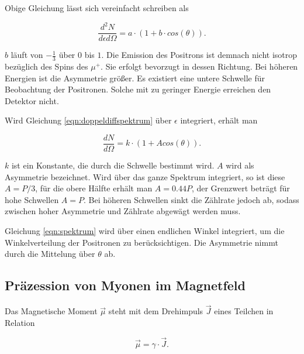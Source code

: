 \documentclass[a4paper,ngerman]{scrartcl}
\begin{document}
Obige Gleichung lässt sich vereinfacht schreiben als

\begin{equation}
\frac{d^2N}{d\epsilon d\Omega} = a \cdot (1 + b \cdot cos(\theta) ) .
\end{equation}

$b$ läuft von $-\frac{1}{3}$ über $0$ bis $1$. Die Emission des Positrons ist demnach nicht isotrop bezüglich des Spins des $\mu^{+}$. Sie erfolgt bevorzugt in dessen Richtung. Bei höheren Energien ist die Asymmetrie größer. Es existiert eine untere Schwelle für Beobachtung der Positronen. Solche mit zu geringer Energie erreichen den Detektor nicht. 

Wird Gleichung \ref{eqn:doppeldiffspektrum} über $\epsilon$ integriert, erhält man

\begin{equation}
\label{eqn:spektrum}
\frac{dN}{ d\Omega} = k \cdot (1 + A cos(\theta) ).
\end{equation}

$k$ ist ein Konstante, die durch die Schwelle bestimmt wird. $A$ wird als Asymmetrie bezeichnet. Wird über das ganze Spektrum integriert, so ist diese $A=P/3$, für die obere Hälfte erhält man $A = 0.44 P$, der Grenzwert beträgt für hohe Schwellen $A=P$. Bei höheren Schwellen sinkt die Zählrate jedoch ab, sodass zwischen hoher Asymmetrie und Zählrate abgewägt werden muss.

Gleichung \ref{eqn:spektrum} wird über einen endlichen Winkel integriert, um die Winkelverteilung der Positronen zu berücksichtigen. Die Asymmetrie nimmt durch die Mittelung über $\theta$ ab.







\subsection{Präzession von Myonen im Magnetfeld}
\label{sec:prazission}

Das Magnetische Moment $\vec{\mu}$ steht mit dem Drehimpuls $\vec{J}$ eines Teilchen in Relation

\begin{equation}
\vec{\mu} = \gamma \cdot \vec{J} .
\end{equation}
\end{document}

